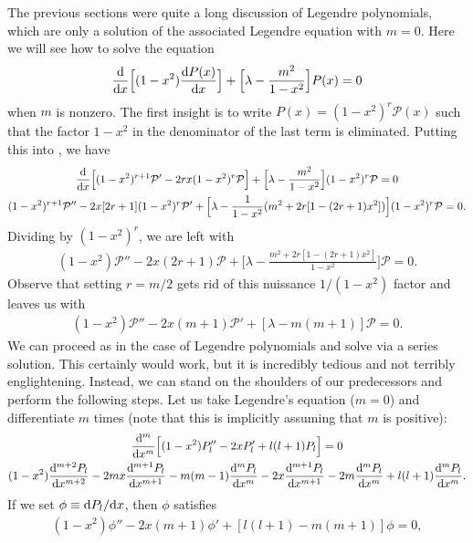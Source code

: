 The previous sections were quite a long discussion of Legendre polynomials, which are only a solution of the associated Legendre equation with $m=0$.
Here we will see how to solve the equation
\begin{eqnarray}
    \dv{x} \Big[ (1-x^2) \dv{P(x)}{x} \Big] + \Big[ \lambda - \frac{m^2}{1-x^2} \Big] P(x) = 0
\end{eqnarray}
when $m$ is nonzero.
The first insight is to write $P(x) = (1-x^2)^{r} \mathcal{P}(x)$ such that the factor $1-x^2$ in the denominator of the last term is eliminated.
Putting this into , we have
\begin{gather}
    \dv{x} \Big[ (1 - x^2)^{r+1} \mathcal{P}' - 2 r x(1 - x^2)^{r} \mathcal{P} \Big] + \Big[ \lambda - \frac{m^2}{1-x^2} \Big] (1-x^2)^{r} \mathcal{P} = 0 \nonumber \\
    (1-x^2)^{r+1}\mathcal{P}'' - 2x [ 2r + 1 ] (1-x^2)^{r} \mathcal{P}' + \Big[ \lambda - \frac{1}{1-x^2} ( m^2 + 2r[1 - (2r+1)x^2]) \Big] (1 - x^2)^{r} \mathcal{P} = 0
.\end{gather}
Dividing by $(1-x^2)^{r}$, we are left with
\begin{eqnarray}
    (1-x^2) \mathcal{P}'' - 2x(2r+1) \mathcal{P} + \Big[ \lambda - \frac{m^2 + 2r[ 1 - (2r + 1)x^2 ]}{1-x^2} \Big] \mathcal{P} = 0
.\end{eqnarray}
Observe that setting $r = m/2$ gets rid of this nuissance $1/(1-x^2)$ factor and leaves us with
\begin{eqnarray}
    (1-x^2) \mathcal{P}'' - 2x (m+1) \mathcal{P}' + [ \lambda - m(m+1) ] \mathcal{P} = 0
.\end{eqnarray}
We can proceed as in the case of Legendre polynomials and solve via a series solution.
This certainly would work, but it is incredibly tedious and not terribly englightening.
Instead, we can stand on the shoulders of our predecessors and perform the following steps.
Let us take Legendre's equation ($m = 0$) and differentiate $m$ times (note that this is implicitly assuming that $m$ is positive):
\begin{gather}
    \dv[m]{x} \Big[ (1-x^2) P_{l}'' - 2x P_{l}' + l(l+1)P_{l} \Big] = 0 \nonumber \\
    (1-x^2) \dv[m+2]{P_{l}}{x} - 2mx \dv[m+1]{P_{l}}{x} - m(m-1) \dv[m]{P_{l}}{x} - 2x \dv[m+1]{P_{l}}{x} - 2m \dv[m]{P_{l}}{x} + l(l+1) \dv[m]{P_{l}}{x}
.\end{gather}
If we set $\phi \equiv {\rm d} P_{l} / {\rm d}x$, then $\phi$ satisfies
\begin{eqnarray}
    (1-x^2) \phi'' - 2x(m+1) \phi' + [ l(l+1) - m(m+1) ] \phi = 0
,\end{eqnarray}
